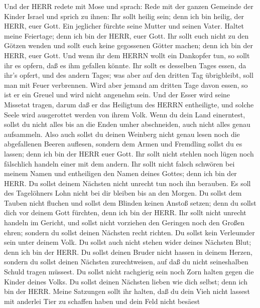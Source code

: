  Und der HERR redete mit Mose und sprach:  Rede
mit der ganzen Gemeinde der Kinder Israel und sprich zu ihnen: Ihr sollt
heilig sein; denn ich bin heilig, der HERR, euer Gott.  Ein
jeglicher fürchte seine Mutter und seinen Vater. Haltet meine Feiertage;
denn ich bin der HERR, euer Gott.  Ihr sollt euch nicht zu
den Götzen wenden und sollt euch keine gegossenen Götter machen; denn
ich bin der HERR, euer Gott.  Und wenn ihr dem HERRN wollt
ein Dankopfer tun, so sollt ihr es opfern, daß es ihm gefallen könnte.
 Ihr sollt es desselben Tages essen, da ihr's opfert, und
des andern Tages; was aber auf den dritten Tag übrigbleibt, soll man mit
Feuer verbrennen.  Wird aber jemand am dritten Tage davon
essen, so ist er ein Greuel und wird nicht angenehm sein. 
Und der Esser wird seine Missetat tragen, darum daß er das Heiligtum des
HERRN entheiligte, und solche Seele wird ausgerottet werden von ihrem
Volk.  Wenn du dein Land einerntest, sollst du nicht alles
bis an die Enden umher abschneiden, auch nicht alles genau aufsammeln.
 Also auch sollst du deinen Weinberg nicht genau lesen noch
die abgefallenen Beeren auflesen, sondern dem Armen und Fremdling sollst
du es lassen; denn ich bin der HERR euer Gott.  Ihr sollt
nicht stehlen noch lügen noch fälschlich handeln einer mit dem andern.
 Ihr sollt nicht falsch schwören bei meinem Namen und
entheiligen den Namen deines Gottes; denn ich bin der HERR.
 Du sollst deinem Nächsten nicht unrecht tun noch ihn
berauben. Es soll des Tagelöhners Lohn nicht bei dir bleiben bis an den
Morgen.  Du sollst dem Tauben nicht fluchen und sollst dem
Blinden keinen Anstoß setzen; denn du sollst dich vor deinem Gott
fürchten, denn ich bin der HERR.  Ihr sollt nicht unrecht
handeln im Gericht, und sollst nicht vorziehen den Geringen noch den
Großen ehren; sondern du sollst deinen Nächsten recht richten.
 Du sollst kein Verleumder sein unter deinem Volk. Du
sollst auch nicht stehen wider deines Nächsten Blut; denn ich bin der
HERR.  Du sollst deinen Bruder nicht hassen in deinem
Herzen, sondern du sollst deinen Nächsten zurechtweisen, auf daß du
nicht seineshalben Schuld tragen müssest.  Du sollst nicht
rachgierig sein noch Zorn halten gegen die Kinder deines Volks. Du
sollst deinen Nächsten lieben wie dich selbst; denn ich bin der HERR.
 Meine Satzungen sollt ihr halten, daß du dein Vieh nicht
lassest mit anderlei Tier zu schaffen haben und dein Feld nicht besäest
